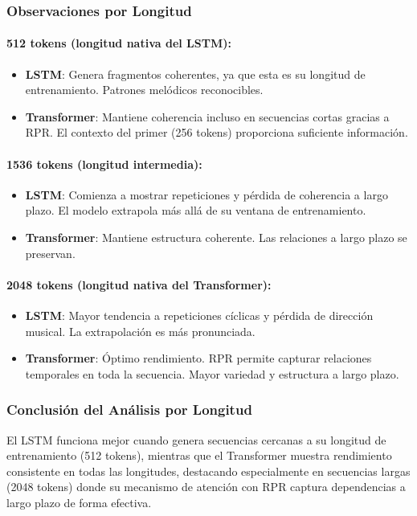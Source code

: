 \documentclass[12pt,a4paper]{article}
\begin{document}
\subsubsection{Observaciones por Longitud}

\paragraph{512 tokens (longitud nativa del LSTM):}
\begin{itemize}
    \item \textbf{LSTM}: Genera fragmentos coherentes, ya que esta es su longitud de entrenamiento. Patrones melódicos reconocibles.
    \item \textbf{Transformer}: Mantiene coherencia incluso en secuencias cortas gracias a RPR. El contexto del primer (256 tokens) proporciona suficiente información.
\end{itemize}

\paragraph{1536 tokens (longitud intermedia):}
\begin{itemize}
    \item \textbf{LSTM}: Comienza a mostrar repeticiones y pérdida de coherencia a largo plazo. El modelo extrapola más allá de su ventana de entrenamiento.
    \item \textbf{Transformer}: Mantiene estructura coherente. Las relaciones a largo plazo se preservan.
\end{itemize}

\paragraph{2048 tokens (longitud nativa del Transformer):}
\begin{itemize}
    \item \textbf{LSTM}: Mayor tendencia a repeticiones cíclicas y pérdida de dirección musical. La extrapolación es más pronunciada.
    \item \textbf{Transformer}: Óptimo rendimiento. RPR permite capturar relaciones temporales en toda la secuencia. Mayor variedad y estructura a largo plazo.
\end{itemize}

\subsubsection{Conclusión del Análisis por Longitud}
El LSTM funciona mejor cuando genera secuencias cercanas a su longitud de entrenamiento (512 tokens), mientras que el Transformer muestra rendimiento consistente en todas las longitudes, destacando especialmente en secuencias largas (2048 tokens) donde su mecanismo de atención con RPR captura dependencias a largo plazo de forma efectiva.
\end{document}
